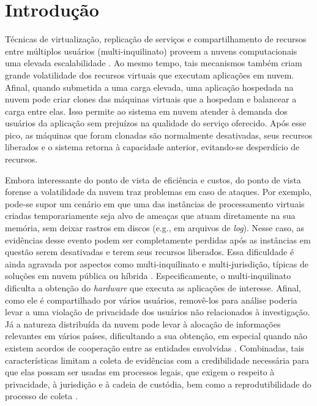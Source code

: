 \chapter{Introdução}
\label{chp:intro}

%
Técnicas de virtualização, replicação de serviços e compartilhamento de recursos entre múltiplos usuários (multi-inquilinato) proveem a nuvens computacionais uma elevada escalabilidade \cite{MorsyCloudSecurity:2010}.
%
Ao mesmo tempo, tais mecanismos também criam grande volatilidade dos recursos virtuais que executam aplicações em nuvem.
%
Afinal, quando submetida a uma carga elevada, uma aplicação hospedada na nuvem pode criar clones das máquinas virtuais que a hospedam e balancear a carga entre elas.
%
Isso permite ao sistema em nuvem atender à demanda dos usuários da aplicação sem prejuízos na qualidade do serviço oferecido. 
%
Após esse pico, as máquinas que foram clonadas são normalmente desativadas, seus recursos liberados e o sistema retorna à capacidade anterior, evitando-se desperdício de recursos.


%
Embora interessante do ponto de vista de eficiência e custos, do ponto de vista forense a volatilidade da nuvem traz problemas em caso de ataques.
%
Por exemplo, pode-se supor um cenário em que uma das instâncias de processamento virtuais criadas temporariamente seja alvo de ameaças que atuam diretamente na sua memória, sem deixar rastros em discos (e.g., em arquivos de \textit{log}).
%
Nesse caso, as evidências desse evento podem ser completamente perdidas após as instâncias em questão serem desativadas e terem seus recursos liberados.
%
Essa dificuldade é ainda agravada por aspectos como multi-inquilinato e multi-jurisdição, típicas de soluções em nuvem pública ou híbrida \cite{BashAdvInForensics:2015}.
%
Especificamente, o multi-inquilinato dificulta a obtenção do \textit{hardware} que executa as aplicações de interesse.
%
Afinal, como ele é compartilhado por vários usuários, removê-los para análise poderia levar a uma violação de privacidade dos usuários não relacionados à investigação. 
%
Já a natureza distribuída da nuvem pode levar à alocação de informações relevantes em vários países, dificultando a sua obtenção, em especial quando não existem acordos de cooperação entre as entidades envolvidas \cite{DykstraAcquiringForIAAS:2012}.
%
Combinadas, tais características limitam a coleta de evidências com a credibilidade necessária para que elas possam ser usadas em processos legais,  que exigem o respeito à privacidade, à jurisdição e à cadeia de custódia, bem como a reprodutibilidade do processo de coleta \cite{RahmanLiveForensicsTechniques:2015}.

